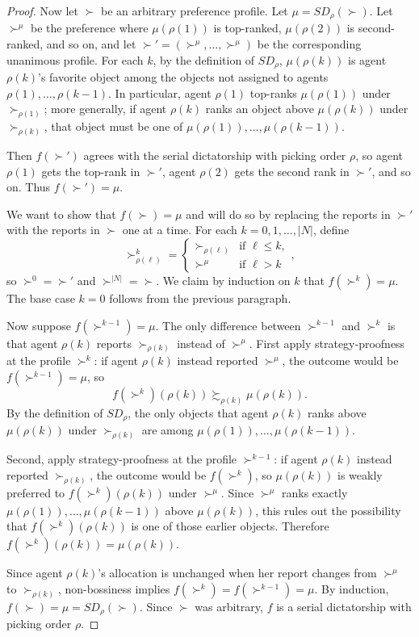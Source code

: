 \begin{proof}
	Now let $\succ$ be an arbitrary preference profile.
	Let $\mu = SD_\rho(\succ)$. Let $\succ^\mu$ be the preference where $\mu(\rho(1))$ is top-ranked, $\mu(\rho(2))$ is second-ranked, and so on, and let $\succ' = (\succ^\mu,\ldots,\succ^\mu)$ be the corresponding unanimous profile.
	For each $k$, by the definition of $SD_\rho$, $\mu(\rho(k))$ is agent $\rho(k)$'s favorite object among the objects not assigned to agents $\rho(1),\ldots,\rho(k-1)$. In particular, agent $\rho(1)$ top-ranks $\mu(\rho(1))$ under $\succ_{\rho(1)}$; more generally, if agent $\rho(k)$ ranks an object above $\mu(\rho(k))$ under $\succ_{\rho(k)}$, that object must be one of $\mu(\rho(1)),\ldots,\mu(\rho(k-1))$.

	Then $f(\succ')$ agrees with the serial dictatorship with picking order $\rho$, so agent $\rho(1)$ gets the top-rank in $\succ'$, agent $\rho(2)$ gets the second rank in $\succ'$, and so on. Thus $f(\succ') = \mu$.
	
	We want to show that $f(\succ) = \mu$ and will do so by replacing the reports in $\succ'$ with the reports in $\succ$ one at a time. For each $k = 0,1,\ldots,\left|N\right|$, define
	\[
		\succ_{\rho(\ell)}^k =
		\begin{cases}
			\succ_{\rho(\ell)} & \text{if } \ell \leq k, \\
			\succ^\mu & \text{if } \ell > k
		\end{cases}
	,\]
	so $\succ^0 = \succ'$ and $\succ^{\left|N\right|} = \succ$. We claim by induction on $k$ that $f(\succ^k) = \mu$. The base case $k=0$ follows from the previous paragraph.

	Now suppose $f(\succ^{k-1}) = \mu$. The only difference between $\succ^{k-1}$ and $\succ^k$ is that agent $\rho(k)$ reports $\succ_{\rho(k)}$ instead of $\succ^\mu$. First apply strategy-proofness at the profile $\succ^k$: if agent $\rho(k)$ instead reported $\succ^\mu$, the outcome would be $f(\succ^{k-1}) = \mu$, so
	\[
		f(\succ^k)(\rho(k)) \succsim_{\rho(k)} \mu(\rho(k))
	.\]
	By the definition of $SD_\rho$, the only objects that agent $\rho(k)$ ranks above $\mu(\rho(k))$ under $\succ_{\rho(k)}$ are among $\mu(\rho(1)),\ldots,\mu(\rho(k-1))$.

	Second, apply strategy-proofness at the profile $\succ^{k-1}$: if agent $\rho(k)$ instead reported $\succ_{\rho(k)}$, the outcome would be $f(\succ^k)$, so $\mu(\rho(k))$ is weakly preferred to $f(\succ^k)(\rho(k))$ under $\succ^\mu$. Since $\succ^\mu$ ranks exactly $\mu(\rho(1)),\ldots,\mu(\rho(k-1))$ above $\mu(\rho(k))$, this rules out the possibility that $f(\succ^k)(\rho(k))$ is one of those earlier objects. Therefore $f(\succ^k)(\rho(k)) = \mu(\rho(k))$.

	Since agent $\rho(k)$'s allocation is unchanged when her report changes from $\succ^\mu$ to $\succ_{\rho(k)}$, non-bossiness implies $f(\succ^k) = f(\succ^{k-1}) = \mu$. By induction, $f(\succ) = \mu = SD_\rho(\succ)$. Since $\succ$ was arbitrary, $f$ is a serial dictatorship with picking order $\rho$.
\end{proof}

